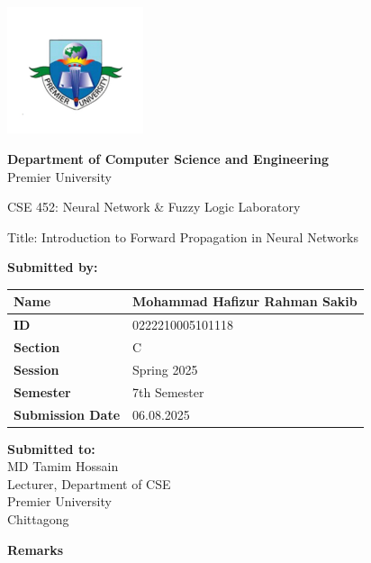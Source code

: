 \documentclass{scrreprt}
\begin{document}
\begin{titlepage}
    \centering
    \includegraphics[width=0.3\textwidth]{logo.jpg} %
    \vspace{1cm}

    \textbf{Department of Computer Science and Engineering}\\
    Premier University
    \vspace{1cm}

    \huge \textnormal{CSE 452: Neural Network \& Fuzzy Logic Laboratory}
    \vspace{1in} %

    \Large \textnormal{Title: Introduction to Forward Propagation in Neural Networks}
    \vspace{0.5in} %

    \large
    \textbf{Submitted by:}
    \begin{tabular}{|p{}|p{}|} %
        \hline
        \textbf{Name} & Mohammad Hafizur Rahman Sakib\\
        \hline
        \textbf{ID} & 0222210005101118 \\
        \hline
        \textbf{Section} & C \\
        \hline
        \textbf{Session} & Spring 2025 \\
        \hline
        \textbf{Semester} & 7th Semester \\
        \hline
        \textbf{Submission Date} & 06.08.2025 \\
        \hline
    \end{tabular}
    \vspace{1cm}

    \begin{minipage}[t]{0.48\textwidth}
        \textbf{Submitted to:}\\
        MD Tamim Hossain\\
        Lecturer, Department of CSE\\
        Premier University\\
        Chittagong
    \end{minipage}%
    \hfill
    \begin{minipage}[t]{0.48\textwidth}
        \raggedleft
        \textbf{Remarks}\\
        \vspace{0.5cm} %
    \end{minipage}

    \date{\today}
    \vfill
\end{titlepage}
\end{document}
